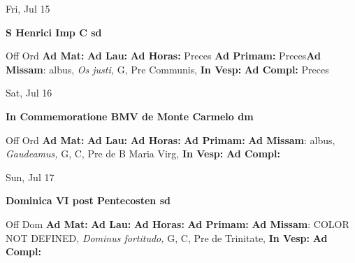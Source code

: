 \documentclass[10pt]{memoir}
\begin{document}
\begin{center}
\begin{minipage}{3.5in}
\vspace{2em}
\begin{center}Fri, Jul 15
\end{center}
\textbf{ \large S Henrici Imp C
\textnormal{\normalsize sd}}

\begin{justify}Off Ord
\textbf{Ad Mat: }
\textbf{Ad Lau: }
\textbf{Ad Horas: }Preces
\textbf{Ad Primam: }Preces\textbf{Ad Missam}: albus, \textit{Os justi,} G, Pre Communis, 
\textbf{In Vesp: }
\textbf{Ad Compl: }Preces
\end{justify}
\end{minipage}
\end{center}

\begin{center}
\begin{minipage}{3.5in}
\vspace{2em}
\begin{center}Sat, Jul 16
\end{center}
\textbf{ \large In Commemoratione BMV de Monte Carmelo
\textnormal{\normalsize dm}}

\begin{justify}Off Ord
\textbf{Ad Mat: }
\textbf{Ad Lau: }
\textbf{Ad Horas: }
\textbf{Ad Primam: }\textbf{Ad Missam}: albus, \textit{Gaudeamus,} G, C, Pre  de B Maria Virg, 
\textbf{In Vesp: }
\textbf{Ad Compl: }
\end{justify}
\end{minipage}
\end{center}

\begin{center}
\begin{minipage}{3.5in}
\vspace{2em}
\begin{center}Sun, Jul 17
\end{center}
\textbf{ \large Dominica VI post Pentecosten
\textnormal{\normalsize sd}}

\begin{justify}Off Dom
\textbf{Ad Mat: }
\textbf{Ad Lau: }
\textbf{Ad Horas: }
\textbf{Ad Primam: }\textbf{Ad Missam}: COLOR NOT DEFINED, \textit{Dominus fortitudo,} G, C, Pre de Trinitate, 
\textbf{In Vesp: }
\textbf{Ad Compl: }
\end{justify}
\end{minipage}
\end{center}
\end{document}
